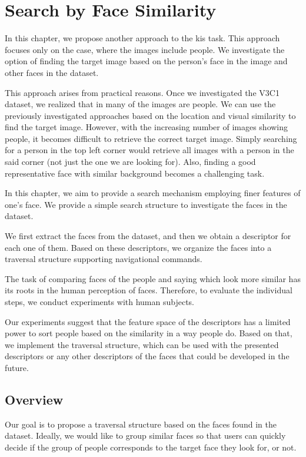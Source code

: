 \chapter{Search by Face Similarity}
\label{ch:face_search}

In this chapter, we propose another approach to the \acrshort{kis} task. This approach focuses only on the case, where the images include people.
We investigate the option of finding the target image based on the person's face in the image and other faces in the dataset.

This approach arises from practical reasons. Once we investigated the V3C1 dataset, we realized that in many of the images are people. We can use the previously investigated approaches based on the location and visual similarity to find the target image. However, with the increasing number of images showing people, it becomes difficult to retrieve the correct target image. Simply searching for a person in the top left corner would retrieve all images with a person in the said corner (not just the one we are looking for). Also, finding a good representative face with similar background becomes a challenging task.

In this chapter, we aim to provide a search mechanism employing finer features of one's face. We provide a simple search structure to investigate the faces in the dataset.

We first extract the faces from the dataset, and then we obtain a descriptor for each one of them. Based on these descriptors, we organize the faces into a traversal structure supporting navigational commands.

The task of comparing faces of the people and saying which look more similar has its roots in the human perception of faces. Therefore, to evaluate the individual steps, we conduct experiments with human subjects.

Our experiments suggest that the feature space of the descriptors has a limited power to sort people based on the similarity in a way people do. Based on that, we implement the traversal structure, which can be used with the presented descriptors or any other descriptors of the faces that could be developed in the future.


\section{Overview}

Our goal is to propose a traversal structure based on the faces found in the dataset. Ideally, we would like to group similar faces so that users can quickly decide if the group of people corresponds to the target face they look for, or not.

